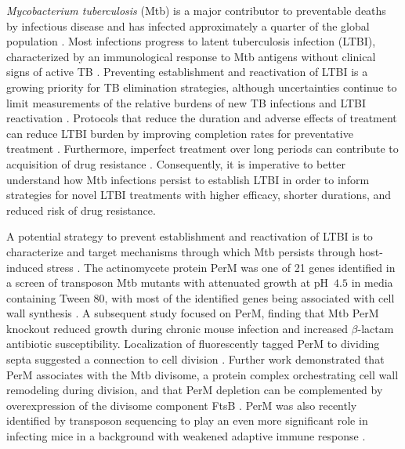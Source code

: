 \documentclass[twocolumn,pdflatex,sn-nature]{sn-jnl}%
\newcommand\mtb{Mtb}
\newcommand\mtbfull{\textit{Mycobacterium tuberculosis}}
\begin{document}
\mtbfull{} (\mtb{}) is a major contributor to preventable deaths by infectious disease and has infected approximately a quarter of the global population \citep{houbenGlobalBurdenLatent2016}.
Most infections progress to latent tuberculosis infection (LTBI), characterized by an immunological response to \mtb{} antigens without clinical signs of active TB \citep{whoLatentTuberculosisInfection2018}.
Preventing establishment and reactivation of LTBI is a growing priority for TB elimination strategies, although uncertainties continue to limit measurements of the relative burdens of new TB infections and LTBI reactivation \citep{daleQuantifyingRatesLate2021}.
Protocols that reduce the duration and adverse effects of treatment can reduce LTBI burden by improving completion rates for preventative treatment \citep{assefaEfficacySafetyDifferent2023}.
Furthermore, imperfect treatment over long periods can contribute to acquisition of drug resistance \citep{liAcquiredResistanceIsoniazid2021}.
Consequently, it is imperative to better understand how \mtb{} infections persist to establish LTBI in order to inform strategies for novel LTBI treatments with higher efficacy, shorter durations, and reduced risk of drug resistance.

A potential strategy to prevent establishment and reactivation of LTBI is to characterize and target mechanisms through which \mtb{} persists through host-induced stress \citep{dartoisAntituberculosisTreatmentStrategies2022}.
The actinomycete protein PerM was one of 21 genes identified in a screen of transposon \mtb{} mutants with attenuated growth at pH~$4.5$ in media containing Tween 80, with most of the identified genes being associated with cell wall synthesis \citep{vandalMembraneProteinPreserves2008}.
A subsequent study focused on PerM, finding that \mtb{} PerM knockout reduced growth during chronic mouse infection and increased $\beta$-lactam antibiotic susceptibility. Localization of fluorescently tagged PerM to dividing septa suggested a connection to cell division \citep{goodsmithDisruptionTuberculosisMembrane2015}.
Further work demonstrated that PerM associates with the \mtb{} divisome, a protein complex orchestrating cell wall remodeling during division, and that PerM depletion can be complemented by overexpression of the divisome component FtsB \citep{wangPersistentMycobacteriumTuberculosis2019}.
PerM was also recently identified by transposon sequencing to play an even more significant role in infecting mice in a background with weakened adaptive immune response \citep{meadeGenomewideScreenIdentifies2023}.
\end{document}
